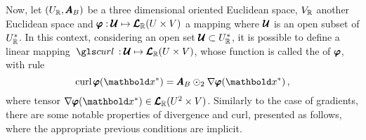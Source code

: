 Now, let $(U_{\mathbb{R}},\pmb{A}_B)$ be a three dimensional oriented Euclidean space, $V_{\mathbb{R}}$ another Euclidean space and $\pmb{{\varphi}} : {\pmb{\mathcal{U}}} \mapsto \pmb{\mathcal{L}}_{\mathbb{R}}(U\times V)$ a mapping where $\pmb{\mathcal{U}}$ is an open subset of $U_{\mathbb{R}}^*$. In this context, considering an open set $\pmb{\mathcal{U}}\subset U_{\mathbb{R}}^*$, it is possible to define a linear mapping  $\map{\gloref{curl}}{{\tnr{\mathcal{U}}}}{\ete{\cam{R}}{U\times V}}$, whose function is called the  of $\pmb{\varphi}$, with rule
\begin{equation}\label{eq:curl}
\fua{\crl{\tnr{{\varphi}}}}{\vto{x}^*}=\tnr{A}_B\odot_{2}\fua{\nabla\tnr{{\varphi}}}{\vto{x}^*}\,,
\end{equation}
where tensor $\fua{\nabla\tnr{{\varphi}}}{\vto{x}^*}\in\ete{\cam{R}}{U^2\times V}$. Similarly to the case of gradients, there are some notable properties of divergence and curl, presented as follows, where the appropriate previous conditions are implicit.
